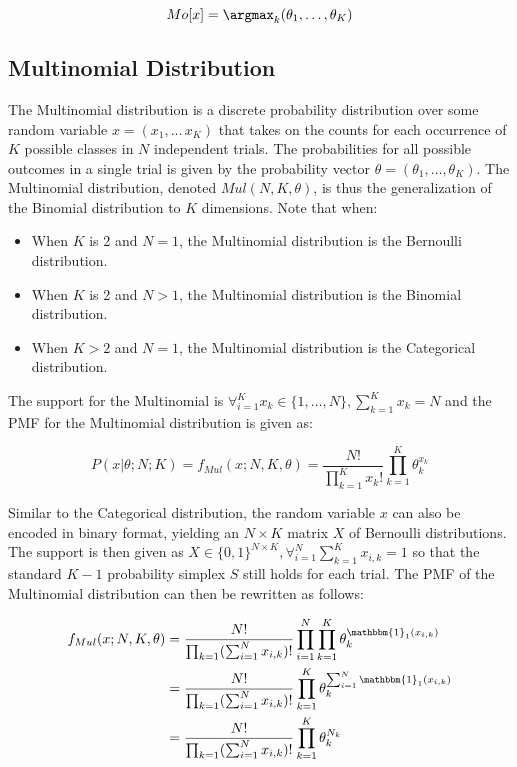 \begin{equation}
Mo[x] = \argmax_{k}(\theta_{1}, \dots, \theta_{K})
\end{equation}


\subsection{Multinomial Distribution}
\label{sec:probability:probability_distributions:multinomial}

The Multinomial distribution is a discrete probability distribution over some random variable $x = (x_{1}, \dots\, x_{K})$ that takes on the counts for each occurrence of $K$ possible classes in $N$ independent trials. The probabilities for all possible outcomes in a single trial is given by the probability vector $\theta = (\theta_{1}, \dots, \theta_{K})$. The Multinomial distribution, denoted $Mul(N, K, \theta)$, is thus the generalization of the Binomial distribution to $K$ dimensions. Note that when:

\begin{itemize}
	\item When $K$ is 2 and $N = 1$, the Multinomial distribution is the Bernoulli distribution.
	\item When $K$ is 2 and $N > 1$, the Multinomial distribution is the Binomial distribution.
	\item When $K > 2$ and $N = 1$, the Multinomial distribution is the Categorical distribution.
\end{itemize}
  
The support for the Multinomial is $\forall_{i=1}^{K} x_{k} \in \{1, \dots, N\}, \sum_{k=1}^{K}x_{k} = N$ and the PMF for the Multinomial distribution is given as:

\begin{equation}
P(x | \theta; N; K) = f_{Mul}(x; N, K, \theta) = \frac{N!}{\prod_{k=1}^{K}x_{k}!} \prod_{k=1}^{K}\theta_{k}^{x_{k}}
\end{equation}

Similar to the Categorical distribution, the random variable $x$ can also be encoded in binary format, yielding an $N \times K$ matrix $X$ of Bernoulli distributions. The support is then given as $X \in \{0, 1\}^{N \times K}, \forall_{i=1}^{N}\sum_{k=1}^{K} x_{i,k} = 1$ so that the standard $K-1$ probability simplex $S$ still holds for each trial. The PMF of the Multinomial distribution can then be rewritten as follows:

\begin{equation}
\begin{split}
f_{Mul}(x; N, K, \theta) &= \frac{N!}{\prod_{k=1}(\sum_{i=1}^{N}x_{i, k})!}\prod_{i=1}^{N}\prod_{k=1}^{K}\theta_{k}^{\mathbbm{1}_{1}(x_{i,k})} \\
	&= \frac{N!}{\prod_{k=1}(\sum_{i=1}^{N}x_{i, k})!} \prod_{k=1}^{K}\theta_{k}^{\sum_{i=1}^{N}\mathbbm{1}_{1}(x_{i,k})} \\
	&= \frac{N!}{\prod_{k=1}(\sum_{i=1}^{N}x_{i, k})!} \prod_{k=1}^{K}\theta_{k}^{N_{k}} \\
\end{split}
\end{equation}

